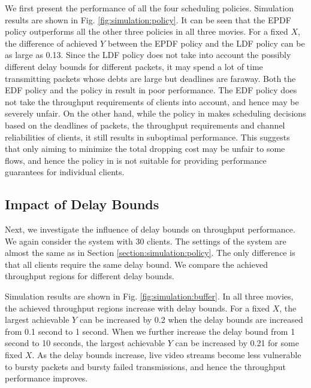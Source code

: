 \documentclass[10pt,nocopyrightspace]{sigplan-proc-varsize-1in}
\begin{document}
We first present the performance of all the four scheduling policies. Simulation results are shown in Fig. \ref{fig:simulation:policy}. It can be seen that the EPDF policy outperforms all the other three policies in all three movies. For a fixed $X$, the difference of achieved $Y$ between the EPDF policy and the LDF policy can be as large as 0.13. Since the LDF policy does not take into account the possibly different delay bounds for different packets, it may spend a lot of time transmitting packets whose debts are large but deadlines are faraway. Both the EDF policy and the policy in \cite{AD07} result in poor performance. The EDF policy does not take the throughput requirements of clients into account, and hence may be severely unfair. On the other hand, while the policy in \cite{AD07} makes scheduling decisions based on the deadlines of packets, the throughput requirements and channel reliabilities of clients, it still results in suboptimal performance. This suggests that only aiming to minimize the total dropping cost may be unfair to some flows, and hence the policy in \cite{AD07} is not suitable for providing performance guarantees for individual clients. 

\subsection{Impact of Delay Bounds}

\begin{figure*}[t]
\hspace{0.01\linewidth} 
\hspace{0.01\linewidth} 
\caption{Achieved throughput regions for different delay bounds.}\label{fig:simulation:buffer}
\end{figure*}


Next, we investigate the influence of delay bounds on throughput performance. We again consider the system with 30 clients. The settings of the system are almost the same as in Section \ref{section:simulation:policy}. The only difference is that all clients require the same delay bound. We compare the achieved throughput regions for different delay bounds.

Simulation results are shown in Fig. \ref{fig:simulation:buffer}. In all three movies, the achieved throughput regions increase with delay bounds. For a fixed $X$, the largest achievable $Y$ can be increased by 0.2 when the delay bounds are increased from 0.1 second to 1 second. When we further increase the delay bound from 1 second to 10 seconds, the largest achievable $Y$ can be increased by 0.21 for some fixed $X$. As the delay bounds increase, live video streams become less vulnerable to bursty packets and bursty failed transmissions, and hence the throughput performance improves.
\end{document}

